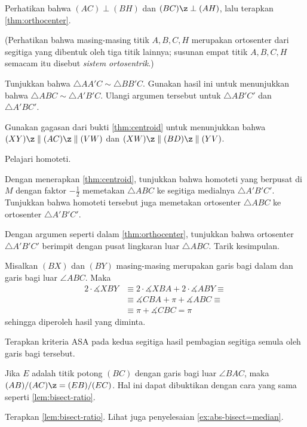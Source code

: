 Perhatikan bahwa $(AC)\perp (BH)$ dan $(BC)\z\perp (AH)$, lalu terapkan \ref{thm:orthocenter}.

(Perhatikan bahwa masing-masing titik $A,B,C,H$ merupakan ortosenter dari segitiga yang dibentuk oleh tiga titik lainnya; susunan empat titik $A,B,C,H$ semacam itu disebut \emph{sistem ortosentrik}.)

Tunjukkan bahwa $\triangle AA'C \sim \triangle BB'C$.
Gunakan hasil ini untuk menunjukkan bahwa $\triangle ABC \sim \triangle A'B'C$.
Ulangi argumen tersebut untuk $\triangle AB'C'$ dan $\triangle A'BC'$.

Gunakan gagasan dari bukti \ref{thm:centroid}
untuk menunjukkan bahwa $(XY)\z\parallel (AC)\z\parallel (VW)$ dan
$(XW)\z\parallel (BD)\z\parallel (YV)$.

Pelajari homoteti.

Dengan menerapkan \ref{thm:centroid}, tunjukkan bahwa homoteti yang berpusat di $M$ dengan faktor $-\tfrac{1}{2}$ memetakan $\triangle ABC$ ke segitiga medialnya $\triangle A'B'C'$.
Tunjukkan bahwa homoteti tersebut juga memetakan ortosenter $\triangle ABC$ ke ortosenter $\triangle A'B'C'$.

Dengan argumen seperti dalam \ref{thm:orthocenter}, tunjukkan bahwa ortosenter $\triangle A'B'C'$ berimpit dengan pusat lingkaran luar $\triangle ABC$.
Tarik kesimpulan.

Misalkan $(BX)$ dan $(BY)$ masing-masing merupakan garis bagi dalam dan garis bagi luar $\angle ABC$.
Maka
\begin{align*}
2\cdot \measuredangle XBY&\equiv2\cdot \measuredangle XBA+2\cdot \measuredangle ABY\equiv
\\
&\equiv
\measuredangle CBA+\pi+ \measuredangle ABC\equiv
\\
&\equiv\pi+\measuredangle CBC=\pi
\end{align*}
sehingga diperoleh hasil yang diminta.

Terapkan kriteria ASA pada kedua segitiga hasil pembagian segitiga semula oleh garis bagi tersebut.

Jika $E$ adalah titik potong $(BC)$
dengan garis bagi luar $\angle BAC$, maka
$\frac{AB}{AC}\z=\frac{EB}{EC}$.
Hal ini dapat dibuktikan dengan cara yang sama seperti \ref{lem:bisect-ratio}.

Terapkan \ref{lem:bisect-ratio}.
Lihat juga penyelesaian \ref{ex:abs-bisect=median}.

